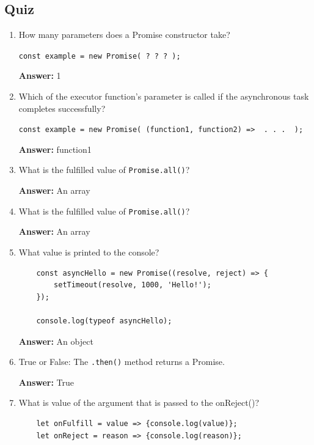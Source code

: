 \documentclass[12pt]{article}
\begin{document}
\subsection{Quiz}
\begin{enumerate}
    \item How many parameters does a Promise constructor take?
    \bigskip

    \texttt{const example = new Promise( ? ? ? );}

    \bigskip

    \textbf{Answer:} 1

    \item Which of the executor function’s parameter is called if the asynchronous task completes successfully?
    \bigskip

    \texttt{const example = new Promise( (function1, function2) => { . . . } );}

    \bigskip

    \textbf{Answer:} function1

    \item What is the fulfilled value of \texttt{Promise.all()}?

    \bigskip

    \textbf{Answer:} An array

    \item What is the fulfilled value of \texttt{Promise.all()}?

    \bigskip

    \textbf{Answer:} An array

    \item What value is printed to the console?

    \begin{lstlisting}
    const asyncHello = new Promise((resolve, reject) => {
        setTimeout(resolve, 1000, 'Hello!');
    });

    console.log(typeof asyncHello);
    \end{lstlisting}

    \bigskip

    \textbf{Answer:} An object

    \item True or False: The \texttt{.then()} method returns a Promise.
    \bigskip

    \textbf{Answer:} True

    \item What is value of the argument that is passed to the onReject()?


    \begin{lstlisting}
    let onFulfill = value => {console.log(value)};
    let onReject = reason => {console.log(reason)};


\end{lstlisting}
\end{enumerate}
\end{document}
